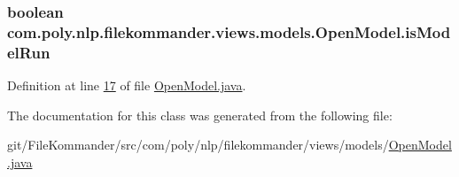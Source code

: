 \hypertarget{classcom_1_1poly_1_1nlp_1_1filekommander_1_1views_1_1models_1_1_open_model_a103a22e09cd8bbe1a6ddbdf92b27bc11}{
\subsubsection[{is\-Model\-Run}]{\setlength{\rightskip}{0pt plus 5cm}boolean com.\-poly.\-nlp.\-filekommander.\-views.\-models.\-Open\-Model.\-is\-Model\-Run\hspace{0.3cm}{\ttfamily [private]}}}\label{classcom_1_1poly_1_1nlp_1_1filekommander_1_1views_1_1models_1_1_open_model_a103a22e09cd8bbe1a6ddbdf92b27bc11}


Definition at line \hyperlink{L17}{17} of file \hyperlink{}{Open\-Model.\-java}.



The documentation for this class was generated from the following file\-:\begin{DoxyCompactItemize}
\item 
git/\-File\-Kommander/src/com/poly/nlp/filekommander/views/models/\hyperlink{_open_model_8java}{Open\-Model.\-java}\end{DoxyCompactItemize}
